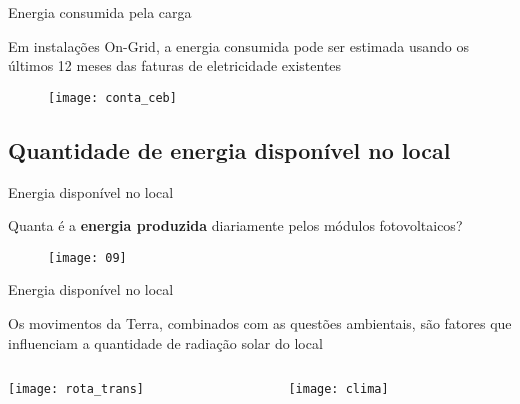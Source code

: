 \begin{frame}{Energia consumida pela carga}

Em instalações On-Grid, a energia consumida pode ser estimada usando os últimos 12 meses das faturas de eletricidade existentes

\begin{figure}[H]
	\texttt{[image: conta\_ceb]}
\end{figure}

\end{frame}

\subsection{Quantidade de energia disponível no local}

\begin{frame}{Energia disponível no local}

Quanta é a \textbf{energia produzida} diariamente pelos módulos fotovoltaicos? 

\begin{figure}[H]
\texttt{[image: 09]}
\end{figure}

\end{frame}

\begin{frame}{Energia disponível no local}

Os movimentos da Terra, combinados com as questões ambientais, são fatores que influenciam a quantidade de radiação solar do local

\vspace{.5cm}

\begin{columns}[T]
    \begin{column}{0.5\textwidth}
		\centering
		\texttt{[image: rota\_trans]}
    \end{column}
    \begin{column}{0.5\textwidth}    
		\centering
      	\texttt{[image: clima]}
    \end{column}
\end{columns}

\end{frame}

